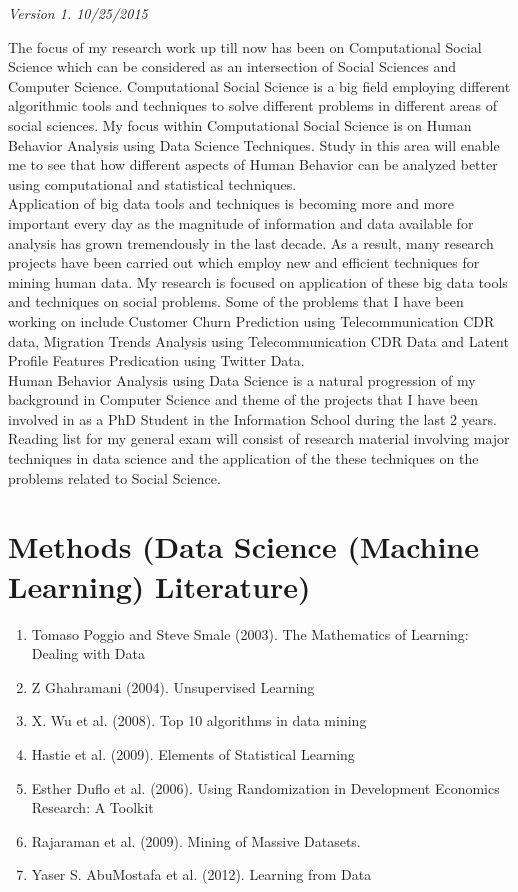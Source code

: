 \textit{Version 1. 10/25/2015} 

The focus of my research work up till now has been on Computational Social Science which can be considered as an intersection of Social Sciences and Computer Science. Computational Social Science is a big field employing different algorithmic tools and techniques to solve different problems in different areas of social sciences. My focus within Computational Social Science is on Human Behavior Analysis using Data Science Techniques. Study in this area will enable me to see that how different aspects of Human Behavior can be analyzed better using computational and statistical techniques.\\
Application of big data tools and techniques is becoming more and more important every day as the magnitude of information and data available for analysis has grown tremendously in the last decade. As a result, many research projects have been carried out which employ new and efficient techniques for mining human data. My research is focused on application of these big data tools and techniques on social problems. Some of the problems that I have been working on include Customer Churn Prediction using Telecommunication CDR data, Migration Trends Analysis using Telecommunication CDR Data  and Latent Profile Features Predication using Twitter Data.\\
Human Behavior Analysis using Data Science is a natural progression of my background in Computer Science and theme of the projects that I have been involved in as a PhD Student in the Information School during the last 2 years. 
Reading list for my general exam will consist of research material involving major techniques in data science and the application of the these techniques on the problems related to Social Science. 
\\
\section{Methods (Data Science (Machine Learning) Literature)}
\begin{enumerate}
\item Tomaso Poggio and Steve Smale (2003). The Mathematics of Learning: Dealing with Data\cite{Poggio_2005}
\item Z Ghahramani (2004). Unsupervised Learning \cite{Ghahramani_2004}
\item X. Wu et al. (2008). Top 10 algorithms in data mining \cite{2009}
\item Hastie et al. (2009). Elements of Statistical Learning \cite{StatisticalLearning_2009}
\item Esther Duflo et al. (2006). Using Randomization in Development Economics Research: A Toolkit \cite{Duflo} 
\item Rajaraman et al. (2009). Mining of Massive Datasets. \cite{Rajaraman_2009}
\item Yaser S. AbuMostafa et al. (2012). Learning from Data \cite{Abu-Mostafa:2012:LD:2207825}
\end{enumerate}


